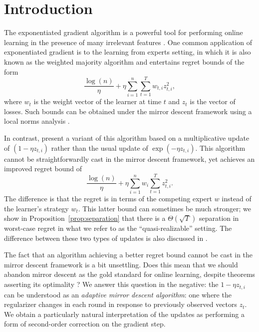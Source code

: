 \documentclass[paper_icml.tex]{subfiles}
\begin{document}
\section{Introduction} 
\label{sec:intro}
The exponentiated gradient algorithm is a powerful tool for performing online 
learning in the presence of many irrelevant features 
\cite{kivinen1997, littlestone1988}. One common application of exponentiated 
gradient is to the learning from experts setting, in which it is also known 
as the weighted majority algorithm \cite{littlestone1989wm} and entertains regret bounds of the 
form 
\[ \frac{\log(n)}{\eta} + \eta \sum_{i=1}^n \sum_{t=1}^T w_{t,i}z_{t,i}^2, \]
where $w_t$ is the weight vector of the learner at time $t$ and $z_t$ is the 
vector of losses. Such bounds can be obtained under the mirror descent 
framework using a local norms analysis \cite{shalev2011}. 

In contrast, \cite{cesa2007} present a variant 
of this algorithm based on a multiplicative update of $(1 - \eta z_{t,i})$ rather 
than the usual update of $\exp(-\eta z_{t,i})$. This algorithm cannot be 
straightforwardly cast in the mirror descent framework, yet achieves an 
improved  regret bound of
\begin{equation}
\label{eqn:mw-regret}
\frac{\log(n)}{\eta} + \eta \sum_{i=1}^n w_i \sum_{t=1}^T z_{t,i}^2.
\end{equation}
The difference is that the regret is in terms of the competing expert $w$ instead 
of the learner's strategy $w_t$. This latter bound can sometimes be much 
stronger; we show in Proposition~\ref{prop:separation} that there is a 
$\Theta(\sqrt{T})$ separation in worst-case regret in what we refer to as the 
``quasi-realizable'' setting. The difference between these two types of updates 
is also discussed in \cite{mw-survey}. %

The fact that an algorithm achieving a better regret bound cannot be cast in the 
mirror descent framework is a bit unsettling. Does this mean that we should 
abandon mirror descent as the gold standard for online learning, despite 
theorems asserting its optimality \cite{srebro2011}? We answer this question 
in the negative: the $1-\eta z_{t,i}$ can be understood as an \emph{adaptive 
mirror descent algorithm}: one where the regularizer changes in each round 
in response to previously observed vectors $z_t$. We obtain a 
particularly natural interpretation of the updates as performing a form of 
second-order correction on the gradient step.
\end{document}
